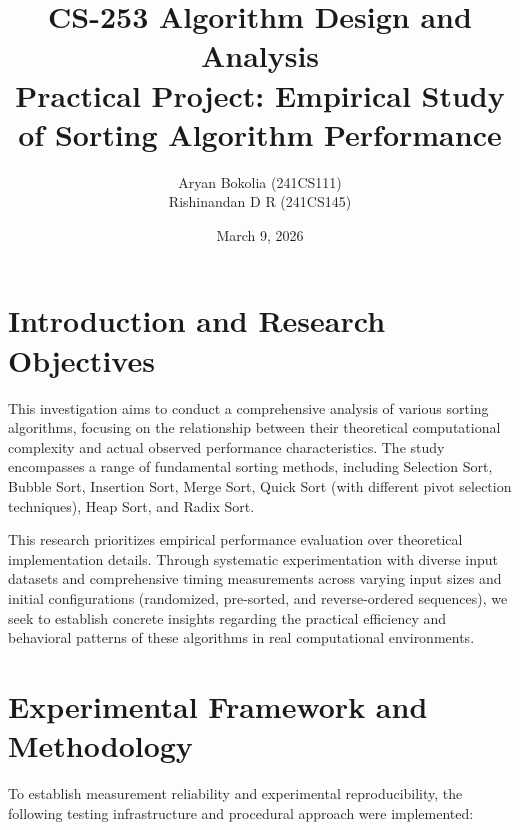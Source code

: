 \documentclass[12pt,a4paper]{article}
\title{CS-253 Algorithm Design and Analysis \\
Practical Project: Empirical Study of Sorting Algorithm Performance}
\author{
Aryan Bokolia (241CS111) \\
Rishinandan D R (241CS145)
}
\date{March 9, 2026}
\begin{document}
\maketitle

\section{Introduction and Research Objectives}
This investigation aims to conduct a comprehensive analysis of various sorting algorithms, focusing on the relationship between their theoretical computational complexity and actual observed performance characteristics. The study encompasses a range of fundamental sorting methods, including Selection Sort, Bubble Sort, Insertion Sort, Merge Sort, Quick Sort (with different pivot selection techniques), Heap Sort, and Radix Sort.

This research prioritizes empirical performance evaluation over theoretical implementation details. Through systematic experimentation with diverse input datasets and comprehensive timing measurements across varying input sizes and initial configurations (randomized, pre-sorted, and reverse-ordered sequences), we seek to establish concrete insights regarding the practical efficiency and behavioral patterns of these algorithms in real computational environments.

\section{Experimental Framework and Methodology}
To establish measurement reliability and experimental reproducibility, the following testing infrastructure and procedural approach were implemented:
\end{document}
